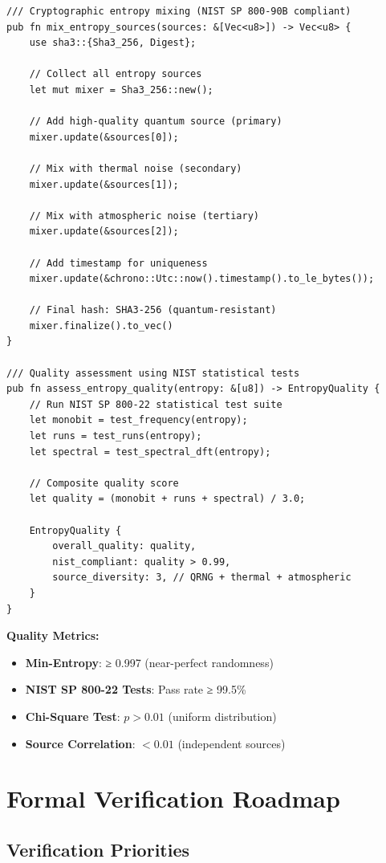 \documentclass[12pt,a4paper]{article}
\begin{document}
\begin{lstlisting}[style=rustcode, caption=Multi-Source Entropy Mixer]
/// Cryptographic entropy mixing (NIST SP 800-90B compliant)
pub fn mix_entropy_sources(sources: &[Vec<u8>]) -> Vec<u8> {
    use sha3::{Sha3_256, Digest};

    // Collect all entropy sources
    let mut mixer = Sha3_256::new();

    // Add high-quality quantum source (primary)
    mixer.update(&sources[0]);

    // Mix with thermal noise (secondary)
    mixer.update(&sources[1]);

    // Mix with atmospheric noise (tertiary)
    mixer.update(&sources[2]);

    // Add timestamp for uniqueness
    mixer.update(&chrono::Utc::now().timestamp().to_le_bytes());

    // Final hash: SHA3-256 (quantum-resistant)
    mixer.finalize().to_vec()
}

/// Quality assessment using NIST statistical tests
pub fn assess_entropy_quality(entropy: &[u8]) -> EntropyQuality {
    // Run NIST SP 800-22 statistical test suite
    let monobit = test_frequency(entropy);
    let runs = test_runs(entropy);
    let spectral = test_spectral_dft(entropy);

    // Composite quality score
    let quality = (monobit + runs + spectral) / 3.0;

    EntropyQuality {
        overall_quality: quality,
        nist_compliant: quality > 0.99,
        source_diversity: 3, // QRNG + thermal + atmospheric
    }
}
\end{lstlisting}

\textbf{Quality Metrics:}
\begin{itemize}
\item \textbf{Min-Entropy}: ≥ 0.997 (near-perfect randomness)
\item \textbf{NIST SP 800-22 Tests}: Pass rate ≥ 99.5\%
\item \textbf{Chi-Square Test}: $p > 0.01$ (uniform distribution)
\item \textbf{Source Correlation}: $< 0.01$ (independent sources)
\end{itemize}

\section{Formal Verification Roadmap}

\subsection{Verification Priorities}
\end{document}

